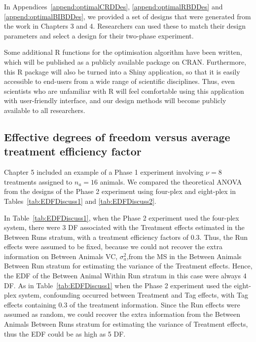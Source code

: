 In Appendices~\ref{append:optimalCRDDes}, \ref{append:optimalRBDDes} and \ref{append:optimalBIBDDes}, we provided a set of designs that were generated from the work in Chapters 3 and 4. Researchers can used these to match their design parameters and select a design for their two-phase experiment.

Some additional \textsf{R} functions for the optimisation algorithm have been written, which will be published as a publicly available package on CRAN. Furthermore, this \textsf{R} package will also be turned into a Shiny application, so that it is easily accessible to end-users from a wide range of scientific disciplines. Thus, even scientists who are unfamiliar with \textsf{R} will feel comfortable using this application with user-friendly interface, and our design methods will become publicly available to all researchers.

\subsection{Effective degrees of freedom versus average treatment efficiency factor}
Chapter 5 included an example of a Phase 1 experiment involving $\nu = 8$ treatments assigned to $n_a = 16$ animals. We compared the theoretical ANOVA from the designs of the Phase 2 experiment using four-plex and eight-plex in Tables~\ref{tab:EDFDiscuss1} and \ref{tab:EDFDiscuss2}. 

In Table~\ref{tab:EDFDiscuss1}, when the Phase 2 experiment used the four-plex system, there were 3 DF associated with the Treatment effects estimated in the Between Runs stratum, with a treatment efficiency factors of $0.3$. Thus, the Run effects were assumed to be fixed, because we could not recover the extra information on Between Animals VC, $\sigma_a^2$,from the MS in the Between Animals Between Run stratum for estimating the variance of the Treatment effects. Hence, the EDF of the Between Animal Within Run stratum in this case were always 4 DF. As in Table~\ref{tab:EDFDiscuss1} when the Phase 2 experiment used the eight-plex system, confounding occurred between Treatment and Tag effects, with Tag effects containing $0.3$ of the treatment information. Since the Run effects were assumed as random, we could recover the extra information from the Between Animals Between Runs stratum for estimating the variance of Treatment effects, thus the EDF could be as high as 5 DF.   

